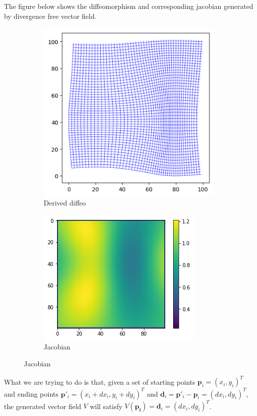 \documentclass{article}
\theoremstyle{definition}
\theoremstyle{plain}
\begin{document}
The figure below shows the diffeomorphism and corresponding jacobian generated by divergence free vector field.
\begin{figure}[H]
    \centering
    \begin{subfigure}[t]{0.45\textwidth}
         \centering
         \includegraphics[scale=0.42]{divfree.png}
         \caption{Derived diffeo}
     \end{subfigure}
     \begin{subfigure}[t]{0.45\textwidth}
         \centering
         \includegraphics[scale=0.5]{divfree_jacobian.png}
         \caption{Jacobian}
     \end{subfigure}
\end{figure}

What we are trying to do is that, given a set of starting points $\mathbf{p}_i=(x_i,y_i)^T$ and ending points $\mathbf{p}'_i=(x_i+dx_i,y_i+dy_i)^T$ and $\mathbf{d}_i=\mathbf{p}'_i-\mathbf{p}_i=(dx_i,dy_i)^T$, the generated vector field $V$ will satisfy $V(\mathbf{p_i})=\mathbf{d}_i=(dx_i,dy_i)^T$. 
\end{document}
